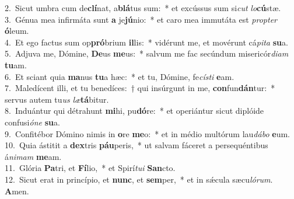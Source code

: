{2.~}Sicut umbra cum de\textbf{clí}nat, a\textbf{blá}tus sum:~* et excússus sum si\textit{cut} \textit{lo}\textbf{cú}stæ.\\
{3.~}Génua mea infirmáta sunt \textbf{a} je\textbf{jú}nio:~* et caro mea immutáta est \textit{prop}\textit{ter} \textbf{ó}leum.\\
{4.~}Et ego factus sum op\textbf{pró}brium \textbf{il}lis:~* vidérunt me, et movérunt cá\textit{pi}\textit{ta} \textbf{su}a.\\
{5.~}Adjuva me, Dómine, \textbf{De}us \textbf{me}us:~* salvum me fac secúndum misericór\textit{di}\textit{am} \textbf{tu}am.\\
{6.~}Et sciant quia \textbf{ma}nus \textbf{tu}a hæc:~* et tu, Dómine, fe\textit{cí}\textit{sti} \textbf{e}am.\\
{7.~}Maledícent illi, et tu benedíces:~† qui insúrgunt in me, \textbf{con}fun\textbf{dán}tur:~* servus autem tu\textit{us} \textit{læ}\textbf{tá}bitur.\\
{8.~}Induántur qui détrahunt \textbf{mi}hi, pu\textbf{dó}re:~* et operiántur sicut diplóide confusi\textit{ó}\textit{ne} \textbf{su}a.\\
{9.~}Confitébor Dómino nimis in \textbf{o}re \textbf{me}o:~* et in médio multórum lau\textit{dá}\textit{bo} \textbf{e}um.\\
{10.~}Quia ástitit a \textbf{dex}tris \textbf{páu}peris,~* ut salvam fáceret a persequéntibus á\textit{ni}\textit{mam} \textbf{me}am.\\
{11.~}Glória \textbf{Pa}tri, et \textbf{Fí}lio,~* et Spirí\textit{tu}\textit{i} \textbf{San}cto.\\
{12.~}Sicut erat in princípio, et \textbf{nunc}, et \textbf{sem}per,~* et in sǽcula sæcu\textit{ló}\textit{rum}. \textbf{A}men.\\

